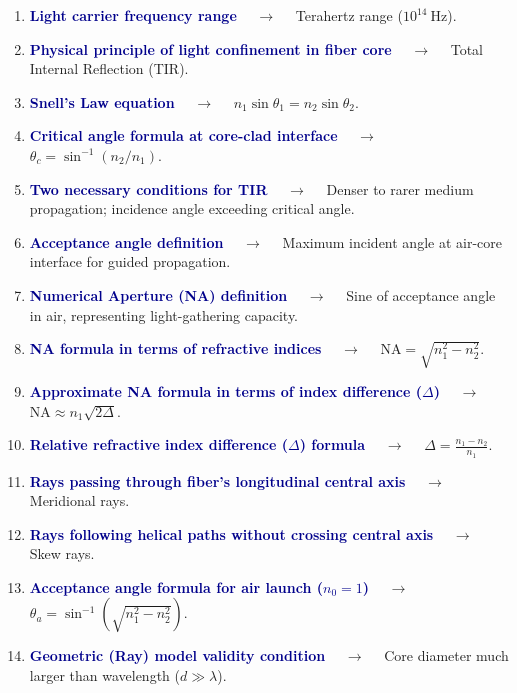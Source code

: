 \documentclass[11pt,a4paper]{article}
\begin{document}
\begin{enumerate}[label=\arabic*., leftmargin=*, labelsep=0.8em, itemsep=0.35em, parsep=0.1em, topsep=0.2em]
  \item \textcolor{darkblue}{\textbf{Light carrier frequency range}} $\quad\to\quad$ Terahertz range ($10^{14}\ \text{Hz}$).
  \item \textcolor{darkblue}{\textbf{Physical principle of light confinement in fiber core}} $\quad\to\quad$ Total Internal Reflection (TIR).
  \item \textcolor{darkblue}{\textbf{Snell's Law equation}} $\quad\to\quad$ $n_1 \sin \theta_1 = n_2 \sin \theta_2$.
  \item \textcolor{darkblue}{\textbf{Critical angle formula at core-clad interface}} $\quad\to\quad$ $\theta_c = \sin^{-1}(n_2 / n_1)$.
  \item \textcolor{darkblue}{\textbf{Two necessary conditions for TIR}} $\quad\to\quad$ Denser to rarer medium propagation; incidence angle exceeding critical angle.
  \item \textcolor{darkblue}{\textbf{Acceptance angle definition}} $\quad\to\quad$ Maximum incident angle at air-core interface for guided propagation.
  \item \textcolor{darkblue}{\textbf{Numerical Aperture (NA) definition}} $\quad\to\quad$ Sine of acceptance angle in air, representing light-gathering capacity.
  \item \textcolor{darkblue}{\textbf{NA formula in terms of refractive indices}} $\quad\to\quad$ $\text{NA} = \sqrt{n_1^2 - n_2^2}$.
  \item \textcolor{darkblue}{\textbf{Approximate NA formula in terms of index difference ($\Delta$)}} $\quad\to\quad$ $\text{NA} \approx n_1 \sqrt{2 \Delta}$.
  \item \textcolor{darkblue}{\textbf{Relative refractive index difference ($\Delta$) formula}} $\quad\to\quad$ $\Delta = \frac{n_1 - n_2}{n_1}$.
  \item \textcolor{darkblue}{\textbf{Rays passing through fiber's longitudinal central axis}} $\quad\to\quad$ Meridional rays.
  \item \textcolor{darkblue}{\textbf{Rays following helical paths without crossing central axis}} $\quad\to\quad$ Skew rays.
  \item \textcolor{darkblue}{\textbf{Acceptance angle formula for air launch ($n_0=1$)}} $\quad\to\quad$ $\theta_a = \sin^{-1}(\sqrt{n_1^2 - n_2^2})$.
  \item \textcolor{darkblue}{\textbf{Geometric (Ray) model validity condition}} $\quad\to\quad$ Core diameter much larger than wavelength ($d \gg \lambda$).

\end{enumerate}
\end{document}
